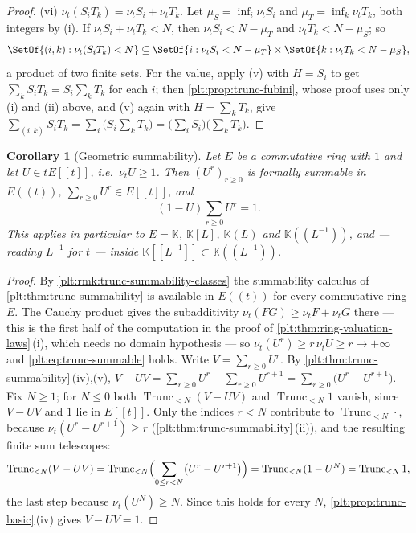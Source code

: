 \documentclass[11pt,oneside]{article}
\theoremstyle{plain}
\newtheorem{corollary}[theorem]{Corollary}
\theoremstyle{definition}
\theoremstyle{remark}
\newcommand{\K}{\mathbb{K}}
\newcommand{\ordt}{\nu_{t}}                              %
\newcommand{\Trunc}[2]{\operatorname{Trunc}_{<#2}#1}     %
\begin{document}
\begin{proof}
(vi)  \(\ordt(S_iT_k)=\ordt S_i+\ordt T_k\).  Let \(\mu_S=\inf_i\ordt S_i\)
and \(\mu_T=\inf_k\ordt T_k\), both integers by (i).  If
\(\ordt S_i+\ordt T_k<N\), then \(\ordt S_i<N-\mu_T\) and
\(\ordt T_k<N-\mu_S\); so
\[
  \SetOf{(i,k):\ordt(S_iT_k)<N}
  \subseteq
  \SetOf{i:\ordt S_i<N-\mu_T}\times\SetOf{k:\ordt T_k<N-\mu_S},
\]
a product of two finite sets.  For the value, apply (v) with \(H=S_i\) to get
\(\sum_kS_iT_k=S_i\sum_kT_k\) for each \(i\); then
\cref{plt:prop:trunc-fubini}, whose proof uses only (i) and (ii) above, and
(v) again with \(H=\sum_kT_k\), give
\(\sum_{(i,k)}S_iT_k=\sum_i\bigl(S_i\sum_kT_k\bigr)
=\bigl(\sum_iS_i\bigr)\bigl(\sum_kT_k\bigr)\).
\end{proof}

\begin{corollary}[Geometric summability]
\label{plt:cor:ring-geometric}
Let \(E\) be a commutative ring with \(1\) and let \(U\in tE[[t]]\), i.e.\
\(\ordt U\ge1\).  Then \((U^r)_{r\ge0}\) is formally summable in \(E((t))\),
\(\sum_{r\ge0}U^r\in E[[t]]\), and
\[
  (1-U)\sum_{r\ge0}U^r=1 .
\]
This applies in particular to \(E=\K\), \(\K[L]\), \(\K(L)\) and
\(\K((L^{-1}))\), and --- reading \(L^{-1}\) for \(t\) --- inside
\(\K[[L^{-1}]]\subset\K((L^{-1}))\).
\end{corollary}

\begin{proof}
By \cref{plt:rmk:trunc-summability-classes} the summability calculus of
\cref{plt:thm:trunc-summability} is available in \(E((t))\) for every
commutative ring \(E\).  The Cauchy product gives the subadditivity
\(\ordt(FG)\ge\ordt F+\ordt G\) there --- this is the first half of the
computation in the proof of \cref{plt:thm:ring-valuation-laws}\,(i), which
needs no domain hypothesis --- so
\(\ordt(U^r)\ge r\,\ordt U\ge r\to+\infty\) and
\eqref{plt:eq:trunc-summable} holds.  Write \(V=\sum_{r\ge0}U^r\).  By
\cref{plt:thm:trunc-summability}\,(iv),(v),
\(V-UV=\sum_{r\ge0}U^r-\sum_{r\ge0}U^{r+1}
=\sum_{r\ge0}\bigl(U^r-U^{r+1}\bigr)\).  Fix \(N\ge1\); for \(N\le0\) both
\(\Trunc{(V-UV)}{N}\) and \(\Trunc{1}{N}\) vanish, since \(V-UV\) and \(1\)
lie in \(E[[t]]\).  Only the indices \(r<N\) contribute to
\(\Trunc{\cdot}{N}\), because \(\ordt(U^r-U^{r+1})\ge r\)
(\cref{plt:thm:trunc-summability}\,(ii)), and the resulting finite sum
telescopes:
\[
  \Trunc{(V-UV)}{N}
  =\Trunc{\Bigl(\sum_{0\le r<N}\bigl(U^r-U^{r+1}\bigr)\Bigr)}{N}
  =\Trunc{(1-U^{N})}{N}
  =\Trunc{1}{N},
\]
the last step because \(\ordt(U^N)\ge N\).  Since this holds for every \(N\),
\cref{plt:prop:trunc-basic}\,(iv) gives \(V-UV=1\).
\end{proof}
\end{document}
